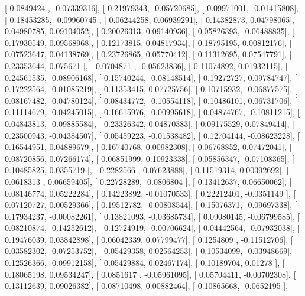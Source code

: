 \documentclass{article}
\begin{document}
       [ 0.0849424 , -0.07339316],
       [ 0.21979343, -0.05720685],
       [ 0.09971001, -0.01415808],
       [ 0.18453285, -0.09960745],
       [ 0.06244258,  0.06939291],
       [ 0.14382873,  0.04798065],
       [ 0.04980785,  0.09104052],
       [ 0.20026313,  0.09140936],
       [ 0.05826393, -0.06488835],
       [ 0.17930549,  0.09568968],
       [ 0.12173815,  0.04817934],
       [ 0.18795195,  0.00812176],
       [ 0.07523647,  0.04138769],
       [ 0.23726865,  0.05770412],
       [ 0.11312695,  0.07547791],
       [ 0.23353644,  0.075671  ],
       [ 0.0704871 , -0.05623836],
       [ 0.11074892,  0.01932115],
       [ 0.24561535, -0.08906168],
       [ 0.15740244, -0.08148514],
       [ 0.19272727,  0.09784747],
       [ 0.17222564, -0.01085219],
       [ 0.11353415,  0.07725756],
       [ 0.10715932, -0.06877575],
       [ 0.08167482, -0.04780124],
       [ 0.08434772, -0.10554118],
       [ 0.10486101,  0.06731706],
       [ 0.11114679, -0.04245015],
       [ 0.16615976, -0.00995618],
       [ 0.04874767, -0.10811215],
       [ 0.04843813, -0.09885584],
       [ 0.23326342,  0.04870383],
       [ 0.09175529,  0.07849414],
       [ 0.23500943, -0.04384507],
       [ 0.05459223, -0.01538482],
       [ 0.12704144, -0.08623228],
       [ 0.16544951,  0.04889679],
       [ 0.16740768,  0.00982308],
       [ 0.06768852,  0.07472041],
       [ 0.08720856,  0.07266174],
       [ 0.06851999,  0.10923338],
       [ 0.05856347, -0.07108365],
       [ 0.10485825,  0.0355719 ],
       [ 0.2282566 ,  0.07623888],
       [ 0.11519314,  0.00392692],
       [ 0.0618313 ,  0.06659405],
       [ 0.22728289, -0.0806804 ],
       [ 0.13412637,  0.06650062],
       [ 0.08146774,  0.05222284],
       [ 0.14223892, -0.01070533],
       [ 0.22212401, -0.0351149 ],
       [ 0.07120727,  0.00529366],
       [ 0.19512782, -0.00808544],
       [ 0.15076371, -0.09697338],
       [ 0.17934237, -0.00082261],
       [ 0.13821093, -0.03685734],
       [ 0.09080145, -0.06799585],
       [ 0.08210874, -0.14252612],
       [ 0.12724919, -0.00706624],
       [ 0.04442564, -0.07932038],
       [ 0.19476039,  0.03842898],
       [ 0.06042339,  0.07799477],
       [ 0.1254809 , -0.11512706],
       [ 0.03582302, -0.07253752],
       [ 0.05429358,  0.02564253],
       [ 0.10534099, -0.03948669],
       [ 0.12526366, -0.09912158],
       [ 0.05429884,  0.02467174],
       [ 0.10189704,  0.01278   ],
       [ 0.18065198,  0.09534247],
       [ 0.0851617 , -0.05961095],
       [ 0.05704411, -0.00702308],
       [ 0.13112639,  0.09026382],
       [ 0.08710498,  0.00882464],
       [ 0.10865668, -0.0652195 ],
\end{document}
